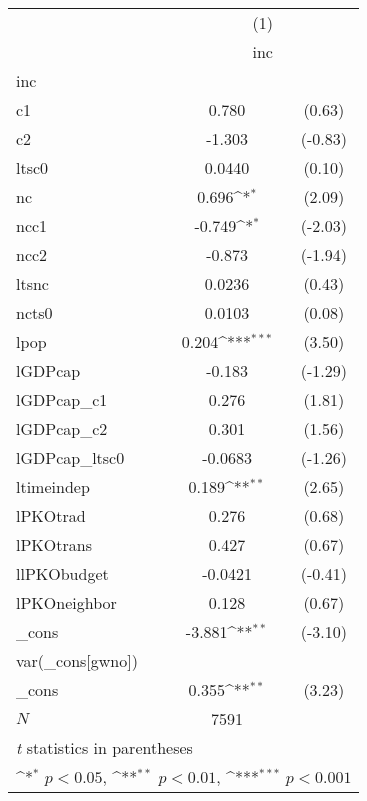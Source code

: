 {
\def\sym#1{\ifmmode^{#1}\else\(^{#1}\)\fi}
\begin{tabular}{l*{1}{cc}}
\hline\hline
            &\multicolumn{2}{c}{(1)}           \\
            &\multicolumn{2}{c}{inc}           \\
\hline
inc         &                     &            \\
c1          &       0.780         &      (0.63)\\
c2          &      -1.303         &     (-0.83)\\
ltsc0       &      0.0440         &      (0.10)\\
nc          &       0.696\sym{*}  &      (2.09)\\
ncc1        &      -0.749\sym{*}  &     (-2.03)\\
ncc2        &      -0.873         &     (-1.94)\\
ltsnc       &      0.0236         &      (0.43)\\
ncts0       &      0.0103         &      (0.08)\\
lpop        &       0.204\sym{***}&      (3.50)\\
lGDPcap     &      -0.183         &     (-1.29)\\
lGDPcap\_c1  &       0.276         &      (1.81)\\
lGDPcap\_c2  &       0.301         &      (1.56)\\
lGDPcap\_ltsc0&     -0.0683         &     (-1.26)\\
ltimeindep  &       0.189\sym{**} &      (2.65)\\
lPKOtrad    &       0.276         &      (0.68)\\
lPKOtrans   &       0.427         &      (0.67)\\
llPKObudget &     -0.0421         &     (-0.41)\\
lPKOneighbor&       0.128         &      (0.67)\\
\_cons      &      -3.881\sym{**} &     (-3.10)\\
\hline
var(\_cons[gwno])&                     &            \\
\_cons      &       0.355\sym{**} &      (3.23)\\
\hline
\(N\)       &        7591         &            \\
\hline\hline
\multicolumn{3}{l}{\footnotesize \textit{t} statistics in parentheses}\\
\multicolumn{3}{l}{\footnotesize \sym{*} \(p<0.05\), \sym{**} \(p<0.01\), \sym{***} \(p<0.001\)}\\
\end{tabular}
}
